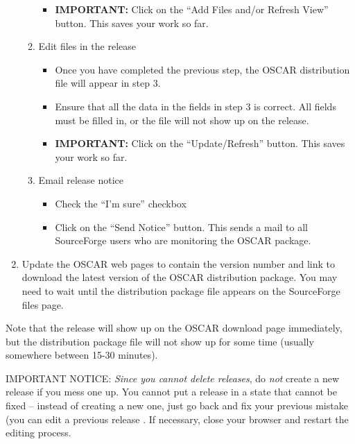 \begin{enumerate}
\begin{enumerate}
\begin{itemize}
    \item {\bf IMPORTANT:} Click on the ``Add Files and/or Refresh
      View'' button.  This saves your work so far.
    \end{itemize}

  \item Edit files in the release

    \begin{itemize}
    \item Once you have completed the previous step, the OSCAR
      distribution file will appear in step 3.

    \item Ensure that all the data in the fields in step 3 is
      correct.  All fields must be filled in, or the file will not
      show up on the release.
      
    \item {\bf IMPORTANT:} Click on the ``Update/Refresh'' button.
      This saves your work so far.
    \end{itemize}

  \item Email release notice

    \begin{itemize}
    \item Check the ``I'm sure'' checkbox

    \item Click on the ``Send Notice'' button.  This sends a mail to
    all SourceForge users who are monitoring the OSCAR package.
    \end{itemize}
    
  \end{enumerate}
  
\item Update the OSCAR web pages to contain the version number and
  link to download the latest version of the OSCAR distribution
  package.  You may need to wait until the distribution package file
  appears on the SourceForge files page.
  
\end{enumerate}

Note that the release will show up on the OSCAR download page
immediately, but the distribution package file will not show up for
some time (usually somewhere between 15-30 minutes).

{\large IMPORTANT NOTICE}: {\em Since you cannot delete releases}, do
{\em not} create a new release if you mess one up.  You cannot put a
release in a state that cannot be fixed -- instead of creating a new
one, just go back and fix your previous mistake (you can edit a
previous release .  If necessary, close
your browser and restart the editing process.

